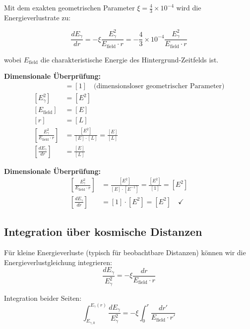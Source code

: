 \documentclass[12pt,a4paper]{report}
\begin{document}
Mit dem exakten geometrischen Parameter $\xi = \frac{4}{3} \times 10^{-4}$ wird die Energieverlustrate zu:

\begin{equation}
	\boxed{\frac{dE_\gamma}{dr} = -\xi \frac{E_\gamma^2}{E_{\text{field}} \cdot r} = -\frac{4}{3} \times 10^{-4} \frac{E_\gamma^2}{E_{\text{field}} \cdot r}}
\end{equation}

wobei $E_{\text{field}}$ die charakteristische Energie des Hintergrund-Zeitfelds ist.

\textbf{Dimensionale Überprüfung:}
\begin{align}
	[\xi] &= [1] \quad \text{(dimensionsloser geometrischer Parameter)} \\
	[E_\gamma^2] &= [E^2] \\
	[E_{\text{field}}] &= [E] \\
	[r] &= [L] \\
	\left[\frac{E_\gamma^2}{E_{\text{field}} \cdot r}\right] &= \frac{[E^2]}{[E] \cdot [L]} = \frac{[E]}{[L]} \\
	\left[\frac{dE_\gamma}{dr}\right] &= \frac{[E]}{[L]} 
\end{align}
	
	\textbf{Dimensionale Überprüfung:}
	\begin{align}
		\left[\frac{E_\gamma^2}{E_{\text{field}} \cdot r}\right] &= \frac{[E^2]}{[E] \cdot [E^{-1}]} = \frac{[E^2]}{[1]} = [E^2] \\
		\left[\frac{dE_\gamma}{dr}\right] &= [1] \cdot [E^2] = [E^2] \quad \checkmark
	\end{align}
	
	\subsection{Integration über kosmische Distanzen}
	\label{subsec:integration_cosmic_distances}
	
	Für kleine Energieverluste (typisch für beobachtbare Distanzen) können wir die Energieverlustgleichung integrieren:
	\begin{equation}
		\frac{dE_\gamma}{E_\gamma^2} = -\xi \frac{dr}{E_{\text{field}} \cdot r}
	\end{equation}
	
	Integration beider Seiten:
	\begin{equation}
		\int_{E_{\gamma,0}}^{E_\gamma(r)} \frac{dE_\gamma}{E_\gamma^2} = -\xi \int_0^r \frac{dr'}{E_{\text{field}} \cdot r'}
	\end{equation}
	
\end{document}
